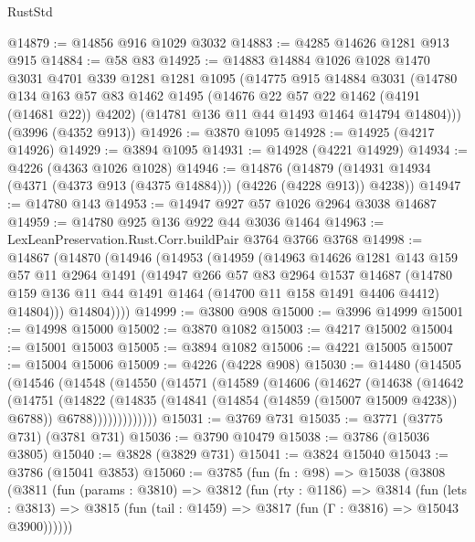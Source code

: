 \begin{lexlean}{RustStd}
\begin{coremodule}
@14879 := @14856 @916 @1029 @3032
@14883 := @4285 @14626 @1281 @913 @915
@14884 := @58 @83
@14925 := @14883
    @14884
    @1026
    @1028
    @1470
    @3031
    @4701
    @339
    @1281
    @1281
    @1095
    (@14775
      @915
      @14884
      @3031
      (@14780
        @134
        @163
        @57
        @83
        @1462
        @1495
        (@14676 @22 @57 @22 @1462 (@4191 (@14681 @22)) @4202)
        (@14781 @136 @11 @44 @1493 @1464 @14794 @14804)))
    (@3996 (@4352 @913))
@14926 := @3870 @1095
@14928 := @14925 (@4217 @14926)
@14929 := @3894 @1095
@14931 := @14928 (@4221 @14929)
@14934 := @4226 (@4363 @1026 @1028)
@14946 := @14876
    (@14879 (@14931 @14934 (@4371 (@4373 @913 (@4375 @14884))) (@4226 (@4228 @913)) @4238))
@14947 := @14780 @143
@14953 := @14947 @927 @57 @1026 @2964 @3038 @14687
@14959 := @14780 @925 @136 @922 @44 @3036 @1464
@14963 := LexLeanPreservation.Rust.Corr.buildPair @3764 @3766 @3768
@14998 := @14867
    (@14870
      (@14946
        (@14953
          (@14959
            (@14963
              @14626
              @1281
              @143
              @159
              @57
              @11
              @2964
              @1491
              (@14947
                @266
                @57
                @83
                @2964
                @1537
                @14687
                (@14780 @159 @136 @11 @44 @1491 @1464 (@14700 @11 @158 @1491 @4406 @4412) @14804)))
            @14804))))
@14999 := @3800 @908
@15000 := @3996 @14999
@15001 := @14998 @15000
@15002 := @3870 @1082
@15003 := @4217 @15002
@15004 := @15001 @15003
@15005 := @3894 @1082
@15006 := @4221 @15005
@15007 := @15004 @15006
@15009 := @4226 (@4228 @908)
@15030 := @14480
    (@14505
      (@14546
        (@14548
          (@14550
            (@14571
              (@14589
                (@14606
                  (@14627
                    (@14638
                      (@14642
                        (@14751
                          (@14822
                            (@14835
                              (@14841 (@14854 (@14859 (@15007 @15009 @4238)) @6788))
                              @6788)))))))))))))
@15031 := @3769 @731
@15035 := @3771 (@3775 @731) (@3781 @731)
@15036 := @3790 @10479
@15038 := @3786 (@15036 @3805)
@15040 := @3828 (@3829 @731)
@15041 := @3824 @15040
@15043 := @3786 (@15041 @3853)
@15060 := @3785
    (fun (fn : @98) =>
    @15038
      (@3808
        (@3811
          (fun (params : @3810) =>
          @3812
            (fun (rty : @1186) =>
            @3814
              (fun (lets : @3813) =>
              @3815 (fun (tail : @1459) => @3817 (fun (Γ : @3816) => @15043 @3900))))))

\end{coremodule}
\end{lexlean}
